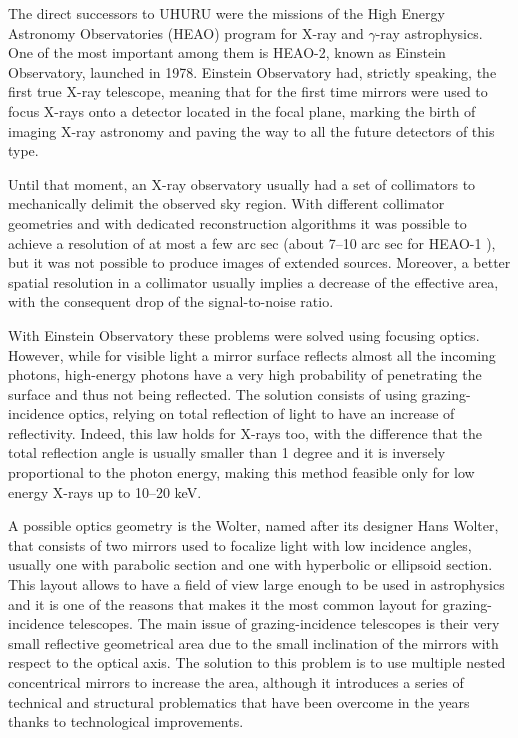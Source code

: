 The direct successors to UHURU were the missions of the High Energy Astronomy Observatories (HEAO) program for X-ray and $\gamma$-ray astrophysics. One of the most important among them is HEAO-2, known as Einstein Observatory, launched in 1978. Einstein Observatory had, strictly speaking, the first true X-ray telescope, meaning that for the first time mirrors were used to focus X-rays onto a detector located in the focal plane, marking the birth of imaging X-ray astronomy and paving the way to all the future detectors of this type.

Until that moment, an X-ray observatory usually had a set of collimators to mechanically delimit the observed sky region. With different collimator geometries and with dedicated reconstruction algorithms it was possible to achieve a resolution of at most a few arc sec (about 7--10 arc sec for HEAO-1 \cite{heao1a3}), but it was not possible to produce images of extended sources. Moreover, a better spatial resolution in a collimator usually implies a decrease of the effective area, with the consequent drop of the signal-to-noise ratio.

With Einstein Observatory these problems were solved using focusing optics. However, while for visible light a mirror surface reflects almost all the incoming photons, high-energy photons have a very high probability of penetrating the surface and thus not being reflected. The solution consists of using grazing-incidence optics, relying on total reflection of light to have an increase of reflectivity. Indeed, this law holds for X-rays too, with the difference that the total reflection angle is usually smaller than 1 degree and it is inversely proportional to the photon energy, making this method feasible only for low energy X-rays up to 10--20 keV.

A possible optics geometry is the Wolter, named after its designer Hans Wolter, that consists of two mirrors used to focalize light with low incidence angles, usually one with parabolic section and one with hyperbolic or ellipsoid section. This layout allows to have a field of view large enough to be used in astrophysics and it is one of the reasons that makes it the most common layout for grazing-incidence telescopes. The main issue of grazing-incidence telescopes is their very small reflective geometrical area due to the small inclination of the mirrors with respect to the optical axis. The solution to this problem is to use multiple nested concentrical mirrors to increase the area, although it introduces a series of technical and structural problematics that have been overcome in the years thanks to technological improvements.

